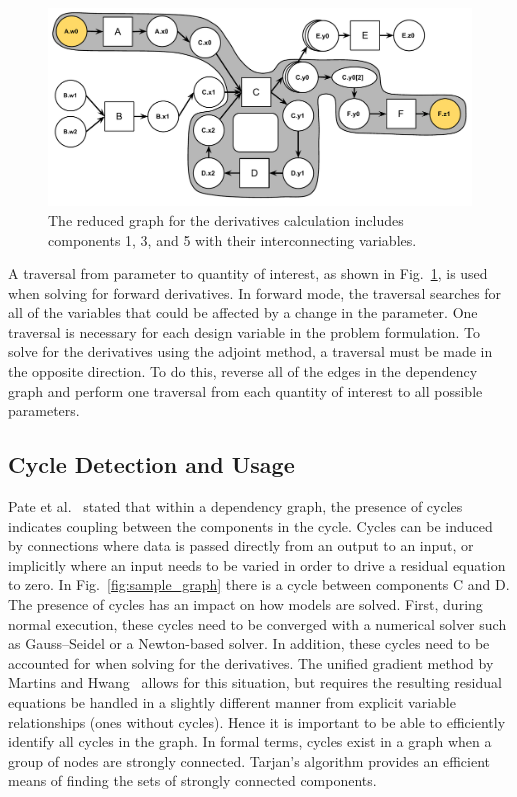 \documentclass[]{aiaa-tc} %
\begin{document}
        \begin{figure}[!htb]\begin{center}
          \includegraphics[width=.8\textwidth]{images/sample_graph_path}
          \caption{ The reduced graph for the derivatives calculation includes components 1, 3,
          and 5 with their interconnecting variables. \label{fig:graph_relevance_path}}
        \end{center}\end{figure}

        A traversal from parameter to quantity of interest, as shown in Fig.~\ref{fig:graph_relevance_path}, is used when solving for
        forward derivatives. In forward mode, the traversal searches for all of the variables that could
        be affected by a change in the parameter. One traversal is necessary for each design variable in the
        problem formulation. To solve for the derivatives using the adjoint method, a traversal must be made in
        the opposite direction. To do this, reverse all of the edges in the dependency graph and
        perform one traversal from each quantity of interest to all possible parameters.

    \subsection{Cycle Detection and Usage}
        Pate et al.~\cite{graph_problem2013} stated that within a dependency graph, the presence of cycles indicates coupling between
        the components in the cycle. Cycles can be induced by connections
        where data is passed directly from an output to an input, or implicitly where an input needs to
        be varied in order to drive a residual equation to zero. In Fig.~\ref{fig:sample_graph} there
        is a cycle between components C and D. The presence of cycles has
        an impact on how models are solved. First, during normal execution, these cycles
        need to be converged with a numerical solver such as Gauss--Seidel or a Newton-based solver.
        In addition, these cycles need to be accounted for when solving for the derivatives.
        The unified gradient method by Martins and Hwang~\cite{martins2013} allows for this situation, but requires the resulting residual equations be
        handled in a slightly different manner from explicit variable relationships (ones without cycles). Hence
        it is important to be able to efficiently identify all cycles in the graph. In formal terms,
        cycles exist in a graph when a group of nodes are strongly connected. Tarjan's algorithm provides
        an efficient means of finding the sets of strongly connected components\cite{tarjan1972depth,nuutila1994finding}.
\end{document}
